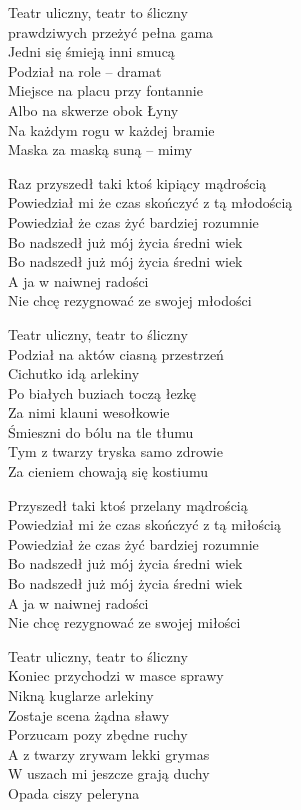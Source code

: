 \begin{text}
    Teatr uliczny, teatr to śliczny\\
    prawdziwych przeżyć pełna gama\\
    Jedni się śmieją inni smucą\\
    Podział na role – dramat\\
    Miejsce na placu przy fontannie\\
    Albo na skwerze obok Łyny\\
    Na każdym rogu w każdej bramie\\
    Maska za maską suną – mimy

    Raz przyszedł taki ktoś kipiący mądrością\\
    Powiedział mi że czas skończyć z tą młodością\\
    Powiedział że czas żyć bardziej rozumnie\\
    Bo nadszedł już mój życia średni wiek\\
    Bo nadszedł już mój życia średni wiek\\
    A ja w naiwnej radości\\
    Nie chcę rezygnować ze swojej młodości

    Teatr uliczny, teatr to śliczny\\
    Podział na aktów ciasną przestrzeń\\
    Cichutko idą arlekiny\\
    Po białych buziach toczą łezkę\\
    Za nimi klauni wesołkowie\\
    Śmieszni do bólu na tle tłumu\\
    Tym z twarzy tryska samo zdrowie\\
    Za cieniem chowają się kostiumu

    Przyszedł taki ktoś przelany mądrością\\
    Powiedział mi że czas skończyć z tą miłością\\
    Powiedział że czas żyć bardziej rozumnie\\
    Bo nadszedł już mój życia średni wiek\\
    Bo nadszedł już mój życia średni wiek\\
    A ja w naiwnej radości\\
    Nie chcę rezygnować ze swojej miłości

    Teatr uliczny, teatr to śliczny\\
    Koniec przychodzi w masce sprawy\\
    Nikną kuglarze arlekiny\\
    Zostaje scena żądna sławy\\
    Porzucam pozy zbędne ruchy\\
    A z twarzy zrywam lekki grymas\\
    W uszach mi jeszcze grają duchy\\
    Opada ciszy peleryna


\end{text}
